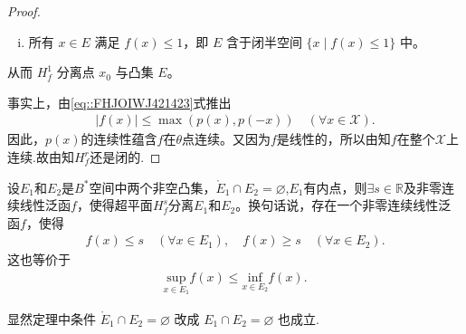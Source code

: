 \documentclass[../../main.tex]{subfiles}%
\begin{document}
\begin{proof}
\begin{enumerate}[(i)]
\item 所有 $x \in E$ 满足 $f(x) \leqslant 1$，即 $E$ 含于闭半空间 $\{x \mid f(x) \leqslant 1\}$ 中。
\end{enumerate}
从而 $H_f^1$ 分离点 $x_0$ 与凸集 $E$。

事实上，由\eqref{eq::FHJOIWJ421423}式推出
\begin{align*}
|f(x)| \leqslant \max(p(x), p(-x)) \quad (\forall x \in \mathscr{X}).
\end{align*}
因此，$p(x)$的连续性蕴含$f$在$\theta$点连续。又因为$f$是线性的，所以由知$f$在整个$\mathscr{X}$上连续.故由知$H_f^r$还是闭的.
\end{proof}

\begin{theorem}[凸集分离定理]\label{theorem:泛函分析--凸集分离定理}
设$E_1$和$E_2$是$B^*$空间中两个非空凸集，$\mathring{E}_1 \cap E_2 = \varnothing$,$E_1$有内点，则$\exists s \in \mathbb{R}$及非零连续线性泛函$f$，使得超平面$H_f^s$分离$E_1$和$E_2$。换句话说，存在一个非零连续线性泛函$f$，使得
\begin{align*}
f(x) \leqslant s \quad (\forall x \in E_1),
\quad 
f(x) \geqslant s \quad (\forall x \in E_2).
\end{align*}
这也等价于
\begin{align*}
\underset{x\in E_1}{\mathrm{sup}}f\left( x \right) \leqslant \underset{x\in E_2}{\mathrm{inf}}f\left( x \right) .
\end{align*}
\end{theorem}
\begin{remark}
显然定理中条件 $\mathring{E}_1 \cap E_2 = \varnothing$ 改成 $E_1 \cap E_2 = \varnothing$ 也成立.
\end{remark}
\end{document}
